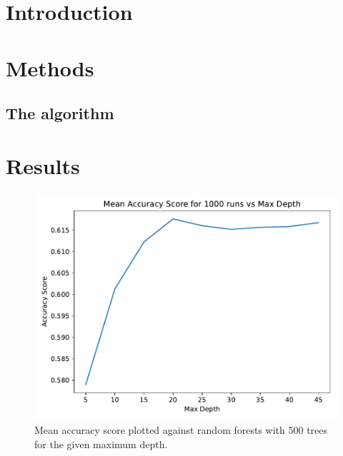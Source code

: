 \documentclass[english,notitlepage,reprint,nofootinbib]{revtex4-1}
\begin{document}
\title{}  %
\author{} %
\date{\today}                             %
\noaffiliation                            %

\begin{abstract}
    \end{abstract}
\maketitle


\section{Introduction}

%

\section{Methods}\label{sec:methods}
%

\subsection*{The algorithm}
%

\section{Results}\label{sec:results}
%
\begin{figure}[ht]
	\centering
	\includegraphics[width=\linewidth]{../plots/tree-accVSdepth.pdf}
	\caption{Mean accuracy score plotted against random forests with 500 trees for the given maximum depth. }
	\label{fig:accVSdepth}
\end{figure}
\end{document}
